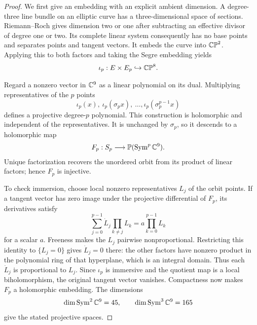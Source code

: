 \begin{proof}
We first give an embedding with an explicit ambient dimension. A
degree-three line bundle on an elliptic curve has a three-dimensional
space of sections. Riemann--Roch gives dimension two or one after
subtracting an effective divisor of degree one or two. Its complete
linear system consequently has no base points and separates points
and tangent vectors. It embeds
the curve into $\mathbb {CP}^2$. Applying this to both factors and taking the
Segre embedding yields
\[
 \iota_p:E\times E_p\hookrightarrow\mathbb {CP}^8.
\]

Regard a nonzero vector in $\mathbb C^9$ as a linear polynomial on its dual.
Multiplying representatives of the $p$ points
\[
 \iota_p(x),\ \iota_p(\sigma_p x),\ \ldots,
 \iota_p(\sigma_p^{p-1}x)
\]
defines a projective degree-$p$ polynomial. This construction is
holomorphic and independent of the representatives. It is unchanged
by $\sigma_p$, so it descends to a holomorphic map
\[
 F_p:S_p\longrightarrow\mathbb P(\operatorname{Sym}^p\mathbb C^9).
\]
Unique factorization recovers the unordered orbit from its product of
linear factors; hence $F_p$ is injective.

To check immersion, choose local nonzero representatives $L_j$ of the
orbit points. If a tangent vector has zero image under the projective
differential of $F_p$, its derivatives satisfy
\[
 \sum_{j=0}^{p-1}\dot L_j\prod_{k\ne j}L_k
   =a\prod_{k=0}^{p-1}L_k
\]
for a scalar $a$. Freeness makes the $L_j$ pairwise nonproportional.
Restricting this identity to $\{L_j=0\}$ gives $\dot L_j=0$ there:
the other factors have nonzero product in the polynomial ring of that
hyperplane, which is an integral domain. Thus each $\dot L_j$ is
proportional to $L_j$. Since $\iota_p$ is immersive and the quotient
map is a local biholomorphism, the original tangent vector vanishes.
Compactness now makes $F_p$ a holomorphic embedding. The dimensions
\[
 \dim\operatorname{Sym}^2\mathbb C^9=45,
 \qquad \dim\operatorname{Sym}^3\mathbb C^9=165
\]
give the stated projective spaces.


\end{proof}
